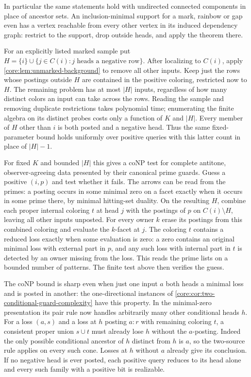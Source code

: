 In particular the same statements hold with undirected connected
components in place of ancestor sets. An inclusion-minimal support
for a mark, rainbow or gap even has a vertex reachable from every
other vertex in its induced dependency graph: restrict to the support,
drop outside heads, and apply the theorem there.

For an explicitly listed marked sample put
$H=\{i\}\cup\{j\in C(i):j\text{ heads a negative row}\}$. After
localizing to $C(i)$, apply \cref{core:lem:unmarked-background} to
remove all other inputs. Keep just the rows whose postings outside
$H$ are contained in the positive coloring, restricted now to $H$.
The remaining problem has at most $|H|$ inputs, regardless of how
many distinct colors an input can take across the rows. Reading the
sample and removing duplicate restrictions takes polynomial time;
enumerating the finite algebra on its distinct probes costs only a
function of $K$ and $|H|$. Every member of $H$ other than $i$ is both
posted and a negative head. Thus the same fixed-parameter bound holds
uniformly over positive queries with this latter count in place of
$|H|-1$.

For fixed $K$ and bounded $|H|$ this gives a coNP test for complete
antitone, observer-agreeing data presented by their canonical prime
guards. Guess a positive $(i,p)$ and test whether it fails. The
arrows can be read from the primes: a posting occurs in some minimal
zero on a facet exactly when it occurs in some prime there, by
minimal hitting-set duality. On the resulting $H$, combine each
proper internal coloring $t$ at head $j$ with the postings of $p$
on $C(i)\setminus H$, leaving all other inputs unposted. For every
owner $k$ erase its postings from this combined coloring and evaluate
the $k$-facet at $j$. The coloring $t$ contains a reduced loss exactly
when some evaluation is zero: a zero contains an original minimal
loss with external part in $p$, and any such loss with internal part
in $t$ is detected by an owner missing from the loss. This reads the
prime lists on a bounded number of patterns. The finite test above
then verifies the guess.

The coNP bound is sharp even when just one input $a$ both heads a
minimal loss and is posted in another: the one-directional instances
of \cref{core:cor:two-conditional-guard-complexity} have this property.
In the minimal-zero presentation its pair rule now handles arbitrarily
many other conditional heads $h$. For a loss $(a,s)$ and a loss at $h$
posting $a:r$ with remaining coloring $t$, a consistent proper union
$s\cup t$ must already lose $h$ without the $a$-posting. Indeed
the only possible conditional ancestor of $h$ distinct from $h$ is
$a$, so the two-source rule applies on every such cone. Losses at $h$
without $a$ already give its conclusion. If no negative head is ever
posted, each positive query reduces to its head alone and every such
family with a positive bit is realizable.

